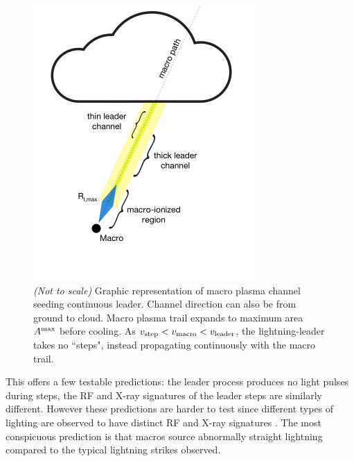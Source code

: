 \documentclass[%
 reprint,
 amsmath,amssymb,
 aps,
]{revtex4-2}
\newcommand{\vtwo}[1]{{\color{red} #1}}
\begin{document}
        \begin{figure}[ht]
            \centering
            \includegraphics[width=\linewidth]{macro_schematic/macro_schematic.pdf}
            \caption{\textit{(Not to scale)} Graphic representation of macro plasma channel seeding continuous leader. \vtwo{Channel direction can also be from ground to cloud. Macro plasma trail expands to maximum area $A^{\rm{max}}$ before cooling.} As $v_{\rm{step}} < v_{\rm{macro}} < v_{\rm{leader}}$, the lightning-leader takes no ``steps", instead propagating continuously with the macro trail.}
            \label{fig:macro_graphic}
        \end{figure}

        This offers a few testable predictions: the leader process produces no light pulses during steps, the RF and X-ray signatures of the leader steps are similarly different. \vtwo{However these predictions are harder to test since different types of lighting are observed to have distinct RF and X-ray signatures \vtwo{\citep{Hare2020}}.} The most conspicuous prediction is that {macros source abnormally straight lightning} compared to the typical lightning strikes observed.
\end{document}
